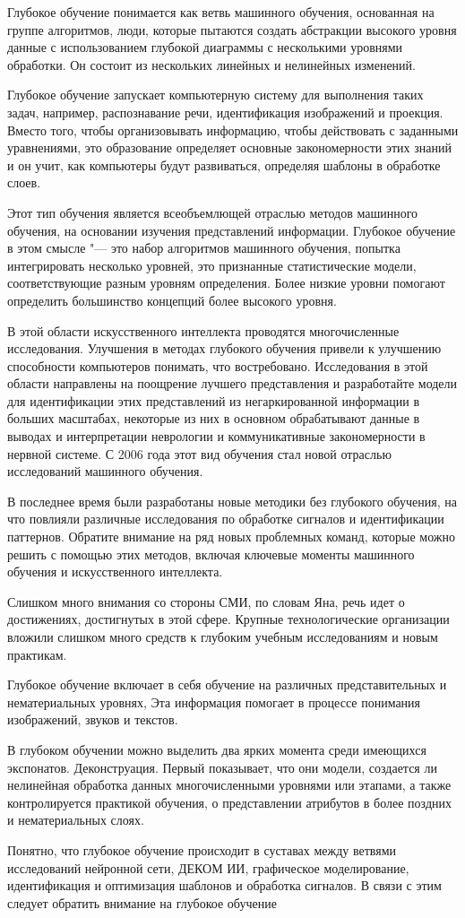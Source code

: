 Глубокое обучение понимается как ветвь машинного обучения, основанная на группе алгоритмов, люди,
которые пытаются создать абстракции высокого уровня данные с использованием глубокой диаграммы с несколькими уровнями обработки.
Он состоит из нескольких линейных и нелинейных изменений.

Глубокое обучение запускает компьютерную систему для выполнения таких задач, например,
распознавание речи, идентификация изображений и проекция.
Вместо того, чтобы организовывать информацию, чтобы действовать с заданными уравнениями,
это образование определяет основные закономерности этих знаний и он учит,
как компьютеры будут развиваться, определяя шаблоны в обработке слоев.

Этот тип обучения является всеобъемлющей отраслью методов машинного обучения, на основании изучения представлений информации.
Глубокое обучение в этом смысле "--- это набор алгоритмов машинного обучения, попытка интегрировать несколько уровней,
это признанные статистические модели, соответствующие разным уровням определения.
Более низкие уровни помогают определить большинство концепций более высокого уровня.

В этой области искусственного интеллекта проводятся многочисленные исследования.
Улучшения в методах глубокого обучения привели к улучшению способности компьютеров понимать, что востребовано.
Исследования в этой области направлены на поощрение лучшего представления и разработайте модели для идентификации
этих представлений из негаркированной информации в больших масштабах, некоторые из них в основном обрабатывают
данные в выводах и интерпретации неврологии и коммуникативные закономерности в нервной системе.
С 2006 года этот вид обучения стал новой отраслью исследований машинного обучения.

В последнее время были разработаны новые методики без глубокого обучения,
на что повлияли различные исследования по обработке сигналов и идентификации паттернов.
Обратите внимание на ряд новых проблемных команд, которые можно решить с помощью этих методов,
включая ключевые моменты машинного обучения и искусственного интеллекта.

Слишком много внимания со стороны СМИ, по словам Яна, речь идет о достижениях, достигнутых в этой сфере.
Крупные технологические организации вложили слишком много средств к глубоким учебным исследованиям и новым практикам.

Глубокое обучение включает в себя обучение на различных представительных и нематериальных уровнях,
Эта информация помогает в процессе понимания изображений, звуков и текстов.

В глубоком обучении можно выделить два ярких момента среди имеющихся экспонатов. Деконструация.
Первый показывает, что они модели, создается ли нелинейная обработка данных многочисленными уровнями или этапами,
а также контролируется практикой обучения, о представлении атрибутов в более поздних и нематериальных слоях.

Понятно, что глубокое обучение происходит в суставах между ветвями исследований нейронной сети,
ДЕКОМ ИИ, графическое моделирование, идентификация и оптимизация шаблонов и обработка сигналов.
В связи с этим следует обратить внимание на глубокое обучение